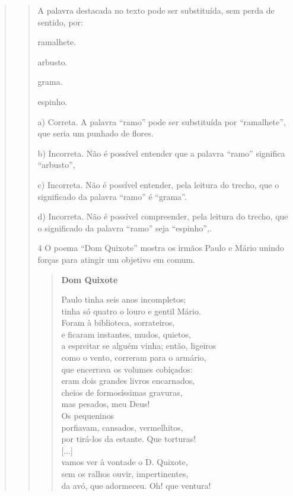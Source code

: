 \begin{escolha}
\begin{escolha}
\begin{quote}
\begin{quote}
A palavra destacada no texto pode ser substituída, sem perda de sentido, por:

\begin{escolha}
\item ramalhete.

\item arbusto.

\item grama.

\item espinho.
\end{escolha}


a)  Correta. A palavra ``ramo'' pode ser substituída por ``ramalhete'',
que seria um punhado de flores.

b)  Incorreta. Não é possível entender que a palavra ``ramo'' significa
``arbusto'',

c)  Incorreta. Não é possível entender, pela leitura do trecho, que o
significado da palavra ``ramo'' é ``grama''.

d)  Incorreta. Não é possível compreender, pela leitura do trecho, que o
significado da palavra ``ramo'' seja ``espinho'',.

\num{4} O poema ``Dom Quixote'' mostra os irmãos Paulo e Mário unindo forças
para atingir um objetivo em comum.

\begin{verse}
\textbf{Dom Quixote}

Paulo tinha seis anos incompletos;\\
tinha só quatro o louro e gentil Mário.\\
Foram à biblioteca, sorrateiros,\\
e ficaram instantes, mudos, quietos,\\
a espreitar se alguém vinha; então, ligeiros\\
como o vento, correram para o armário,\\
que encerrava os volumes cobiçados:\\
eram dois grandes livros encarnados,\\
cheios de formosíssimas gravuras,\\
mas pesados, meu Deus!\\
Os pequeninos\\
porfiavam, cansados, vermelhitos,\\
por tirá-los da estante. Que torturas!\\
{[}...{]}\\
vamos ver à vontade o D. Quixote,\\
sem os ralhos ouvir, impertinentes,\\
da avó, que adormeceu. Oh! que ventura!
\end{verse}


\end{quote}
\end{quote}
\end{escolha}
\end{escolha}
